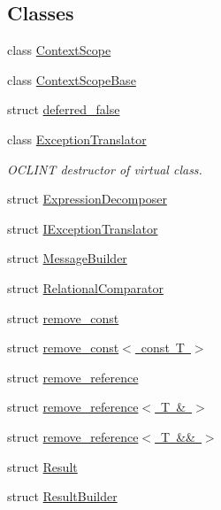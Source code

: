 \subsection*{Classes}
\begin{DoxyCompactItemize}
\item 
class \mbox{\hyperlink{classdoctest_1_1detail_1_1_context_scope}{Context\+Scope}}
\item 
class \mbox{\hyperlink{classdoctest_1_1detail_1_1_context_scope_base}{Context\+Scope\+Base}}
\item 
struct \mbox{\hyperlink{structdoctest_1_1detail_1_1deferred__false}{deferred\+\_\+false}}
\item 
class \mbox{\hyperlink{classdoctest_1_1detail_1_1_exception_translator}{Exception\+Translator}}
\begin{DoxyCompactList}\small\item\em O\+C\+L\+I\+NT destructor of virtual class. \end{DoxyCompactList}\item 
struct \mbox{\hyperlink{structdoctest_1_1detail_1_1_expression_decomposer}{Expression\+Decomposer}}
\item 
struct \mbox{\hyperlink{structdoctest_1_1detail_1_1_i_exception_translator}{I\+Exception\+Translator}}
\item 
struct \mbox{\hyperlink{structdoctest_1_1detail_1_1_message_builder}{Message\+Builder}}
\item 
struct \mbox{\hyperlink{structdoctest_1_1detail_1_1_relational_comparator}{Relational\+Comparator}}
\item 
struct \mbox{\hyperlink{structdoctest_1_1detail_1_1remove__const}{remove\+\_\+const}}
\item 
struct \mbox{\hyperlink{structdoctest_1_1detail_1_1remove__const_3_01const_01_t_01_4}{remove\+\_\+const$<$ const T $>$}}
\item 
struct \mbox{\hyperlink{structdoctest_1_1detail_1_1remove__reference}{remove\+\_\+reference}}
\item 
struct \mbox{\hyperlink{structdoctest_1_1detail_1_1remove__reference_3_01_t_01_6_01_4}{remove\+\_\+reference$<$ T \& $>$}}
\item 
struct \mbox{\hyperlink{structdoctest_1_1detail_1_1remove__reference_3_01_t_01_6_6_01_4}{remove\+\_\+reference$<$ T \&\& $>$}}
\item 
struct \mbox{\hyperlink{structdoctest_1_1detail_1_1_result}{Result}}
\item 
struct \mbox{\hyperlink{structdoctest_1_1detail_1_1_result_builder}{Result\+Builder}}

\end{DoxyCompactItemize}
